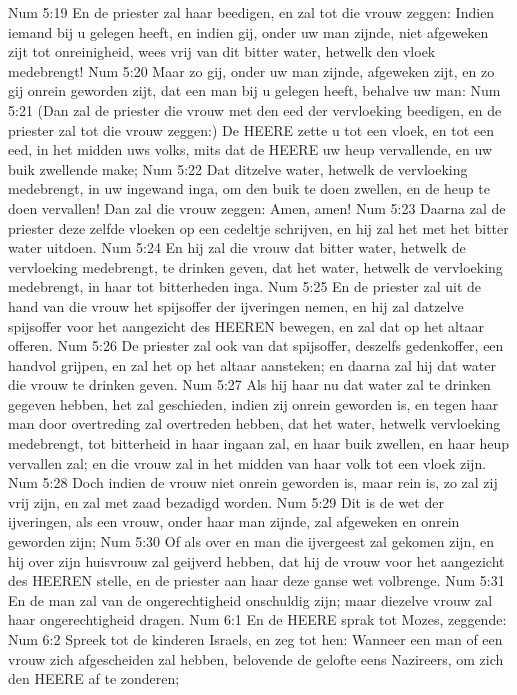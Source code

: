Num 5:19  En de priester zal haar beedigen, en zal tot die vrouw zeggen: Indien iemand bij u gelegen heeft, en indien gij, onder uw man zijnde, niet afgeweken zijt tot onreinigheid, wees vrij van dit bitter water, hetwelk den vloek medebrengt!
Num 5:20  Maar zo gij, onder uw man zijnde, afgeweken zijt, en zo gij onrein geworden zijt, dat een man bij u gelegen heeft, behalve uw man:
Num 5:21  (Dan zal de priester die vrouw met den eed der vervloeking beedigen, en de priester zal tot die vrouw zeggen:) De HEERE zette u tot een vloek, en tot een eed, in het midden uws volks, mits dat de HEERE uw heup vervallende, en uw buik zwellende make;
Num 5:22  Dat ditzelve water, hetwelk de vervloeking medebrengt, in uw ingewand inga, om den buik te doen zwellen, en de heup te doen vervallen! Dan zal die vrouw zeggen: Amen, amen!
Num 5:23  Daarna zal de priester deze zelfde vloeken op een cedeltje schrijven, en hij zal het met het bitter water uitdoen.
Num 5:24  En hij zal die vrouw dat bitter water, hetwelk de vervloeking medebrengt, te drinken geven, dat het water, hetwelk de vervloeking medebrengt, in haar tot bitterheden inga.
Num 5:25  En de priester zal uit de hand van die vrouw het spijsoffer der ijveringen nemen, en hij zal datzelve spijsoffer voor het aangezicht des HEEREN bewegen, en zal dat op het altaar offeren.
Num 5:26  De priester zal ook van dat spijsoffer, deszelfs gedenkoffer, een handvol grijpen, en zal het op het altaar aansteken; en daarna zal hij dat water die vrouw te drinken geven.
Num 5:27  Als hij haar nu dat water zal te drinken gegeven hebben, het zal geschieden, indien zij onrein geworden is, en tegen haar man door overtreding zal overtreden hebben, dat het water, hetwelk vervloeking medebrengt, tot bitterheid in haar ingaan zal, en haar buik zwellen, en haar heup vervallen zal; en die vrouw zal in het midden van haar volk tot een vloek zijn.
Num 5:28  Doch indien de vrouw niet onrein geworden is, maar rein is, zo zal zij vrij zijn, en zal met zaad bezadigd worden.
Num 5:29  Dit is de wet der ijveringen, als een vrouw, onder haar man zijnde, zal afgeweken en onrein geworden zijn;
Num 5:30  Of als over en man die ijvergeest zal gekomen zijn, en hij over zijn huisvrouw zal geijverd hebben, dat hij de vrouw voor het aangezicht des HEEREN stelle, en de priester aan haar deze ganse wet volbrenge.
Num 5:31  En de man zal van de ongerechtigheid onschuldig zijn; maar diezelve vrouw zal haar ongerechtigheid dragen.
Num 6:1  En de HEERE sprak tot Mozes, zeggende:
Num 6:2  Spreek tot de kinderen Israels, en zeg tot hen: Wanneer een man of een vrouw zich afgescheiden zal hebben, belovende de gelofte eens Nazireers, om zich den HEERE af te zonderen;
